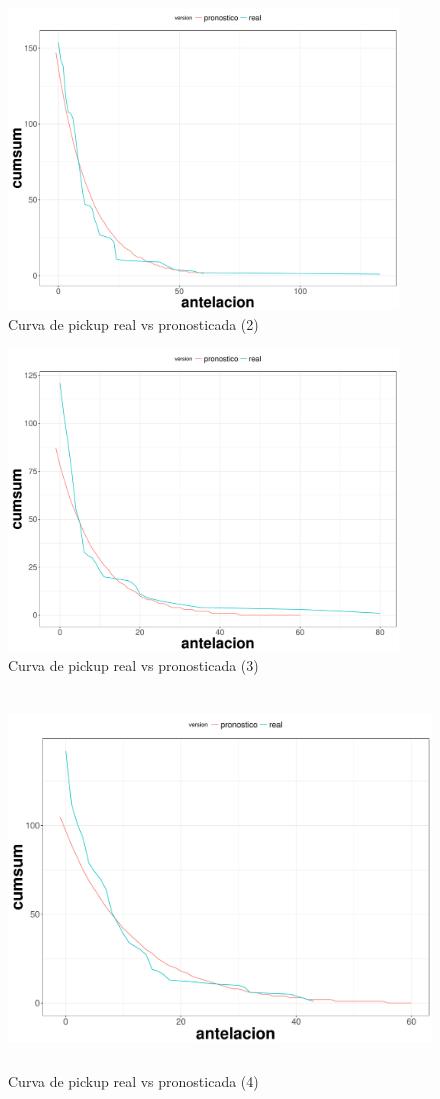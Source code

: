 \begin{figure}[H]
  \centering
      \includegraphics[width=\maxwidth,height=8cm]{figures/Resultados-2}  
  \caption{Curva de pickup real vs pronosticada (2)}
\end{figure}

\begin{figure}[H]
  \centering
      \includegraphics[width=\maxwidth,height=8cm]{figures/Resultados-3}  
  \caption{Curva de pickup real vs pronosticada (3)}
\end{figure}

\begin{figure}[H]
  \centering
      \includegraphics[width=\maxwidth,height=10cm]{figures/Resultados-4}  
  \caption{Curva de pickup real vs pronosticada (4)}
\end{figure}


